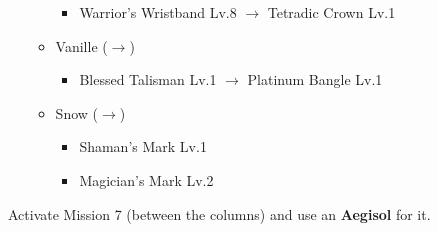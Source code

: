 \begin{menu}
\begin{itemize}
\begin{itemize}
\begin{itemize}
					\item Warrior's Wristband Lv.8 $\rightarrow$ Tetradic Crown Lv.1
				\end{itemize}
			\item Vanille ($\rightarrow$)
			    \begin{itemize}
					\item Blessed Talisman Lv.1 $\rightarrow$ Platinum Bangle Lv.1
			    \end{itemize}
			\item Snow ($\rightarrow$)
			    \begin{itemize}
				    \item Shaman's Mark Lv.1
				    \item Magician's Mark Lv.2
			    \end{itemize}
		\end{itemize}
	\end{itemize}
\end{menu}

\renewcommand{\first}{[1] Mystic Tower (\rav/\rav/\sen)}
\renewcommand{\second}{[2] Tri-Disaster (\rav/\rav/\rav)}
\renewcommand{\third}{[3] Hero's Charge (\syn/\med/\com)}
\renewcommand{\fourth}{[4] Smart Bomb (\rav/\sab/\rav)}
\renewcommand{\fifth}{[5] Aggression (\com/\rav/\com)}
\renewcommand{\sixth}{[6] Dirty Fighting (\com/\sab/\sen)}

Activate Mission 7 (between the columns) and use an \textbf{Aegisol} for it.

